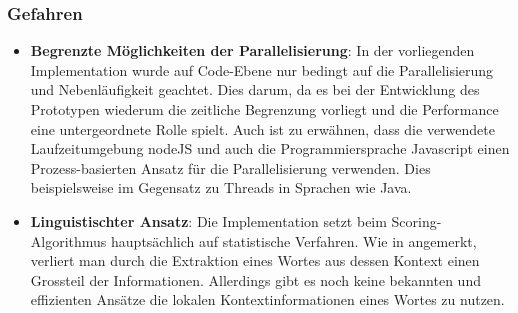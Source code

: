\subsubsection{Gefahren}

\begin{itemize}
    \item \textbf{Begrenzte Möglichkeiten der Parallelisierung}: In der vorliegenden Implementation wurde auf Code-Ebene nur bedingt auf die Parallelisierung und Nebenläufigkeit geachtet. Dies darum, da es bei der Entwicklung des Prototypen wiederum die zeitliche Begrenzung vorliegt und die Performance eine untergeordnete Rolle spielt. Auch ist zu erwähnen, dass die verwendete Laufzeitumgebung nodeJS und auch die Programmiersprache Javascript einen Prozess-basierten Ansatz für die Parallelisierung verwenden. Dies beispielsweise im Gegensatz zu Threads in Sprachen wie Java.
    \item \textbf{Linguistischter Ansatz}: Die Implementation setzt beim Scoring-Algorithmus hauptsächlich auf statistische Verfahren. Wie in \cite[S.~1-2]{Zhang2006} angemerkt, verliert man durch die Extraktion eines Wortes aus dessen Kontext einen Grossteil der Informationen. Allerdings gibt es noch keine bekannten und effizienten Ansätze die lokalen Kontextinformationen eines Wortes zu nutzen.
\end{itemize}






